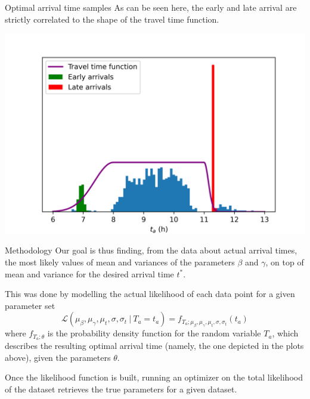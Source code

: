 \documentclass{beamer}
\begin{document}
\begin{frame}{Optimal arrival time samples}
  As can be seen here, the early and late arrival are strictly correlated to the shape of the travel time function.
  \begin{center}
    \includegraphics[width=\textwidth]{t_as_bins_tt}
  \end{center}
\end{frame}

\begin{frame}{Methodology}
  Our goal is thus finding, from the data about actual arrival times, the most likely values of mean and variances of the parameters \(\beta\) and \(\gamma\), on top of mean and variance for the desired arrival time \(t^*\).

  This was done by modelling the actual likelihood of each data point for a given parameter set
  \begin{equation*}
    \mathcal{L}(\mu_\beta, \mu_\gamma, \mu_t, \sigma, \sigma_t\ \vert\ T_a = t_a) =
  f_{T_a; \mu_\beta, \mu_\gamma, \mu_t, \sigma, \sigma_t}(t_a)
  \end{equation*}
  where \(f_{T_a; \theta}\) is the probability density function for the random variable \(T_a\),
  which describes the resulting optimal arrival time (namely, the one depicted in the plots above), given the parameters \(\theta\).
  
  Once the likelihood function is built, running an optimizer on the total likelihood of the dataset retrieves the true parameters for a given dataset.
\end{frame}
\end{document}
